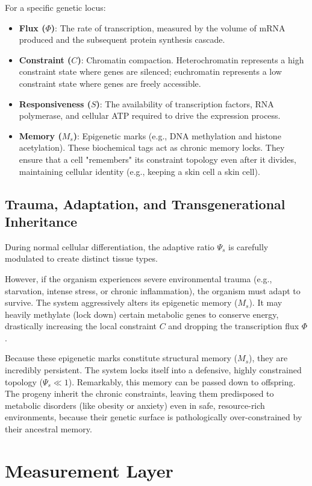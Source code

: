 \documentclass[11pt,a4paper]{article}
\begin{document}
For a specific genetic locus:
\begin{itemize}
    \item \textbf{Flux ($\Phi$)}: The rate of transcription, measured by the volume of mRNA produced and the subsequent protein synthesis cascade.
    \item \textbf{Constraint ($C$)}: Chromatin compaction. Heterochromatin represents a high constraint state where genes are silenced; euchromatin represents a low constraint state where genes are freely accessible.
    \item \textbf{Responsiveness ($S$)}: The availability of transcription factors, RNA polymerase, and cellular ATP required to drive the expression process.
    \item \textbf{Memory ($M_s$)}: Epigenetic marks (e.g., DNA methylation and histone acetylation). These biochemical tags act as chronic memory locks. They ensure that a cell "remembers" its constraint topology even after it divides, maintaining cellular identity (e.g., keeping a skin cell a skin cell).
\end{itemize}

\subsection{Trauma, Adaptation, and Transgenerational Inheritance}
During normal cellular differentiation, the adaptive ratio $\Psi_s$ is carefully modulated to create distinct tissue types.

However, if the organism experiences severe environmental trauma (e.g., starvation, intense stress, or chronic inflammation), the organism must adapt to survive. The system aggressively alters its epigenetic memory ($M_s$). It may heavily methylate (lock down) certain metabolic genes to conserve energy, drastically increasing the local constraint $C$ and dropping the transcription flux $\Phi$.

Because these epigenetic marks constitute structural memory ($M_s$), they are incredibly persistent. The system locks itself into a defensive, highly constrained topology ($\Psi_s \ll 1$). Remarkably, this memory can be passed down to offspring. The progeny inherit the chronic constraints, leaving them predisposed to metabolic disorders (like obesity or anxiety) even in safe, resource-rich environments, because their genetic surface is pathologically over-constrained by their ancestral memory.



\section{Measurement Layer}
\end{document}
